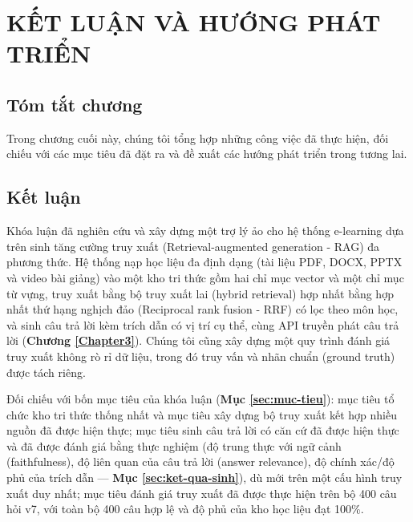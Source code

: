\chapter{KẾT LUẬN VÀ HƯỚNG PHÁT TRIỂN}
\label{Chapter5}

\section*{Tóm tắt chương}
Trong chương cuối này, chúng tôi tổng hợp những công việc đã thực hiện, đối chiếu với các mục tiêu đã đặt ra và đề xuất các hướng phát triển trong tương lai.

\section{Kết luận}

Khóa luận đã nghiên cứu và xây dựng một trợ lý ảo cho hệ thống e-learning dựa trên sinh tăng cường truy xuất (Retrieval-augmented generation - RAG) đa phương thức. Hệ thống nạp học liệu đa định dạng (tài liệu PDF, DOCX, PPTX và video bài giảng) vào một kho tri thức gồm hai chỉ mục vector và một chỉ mục từ vựng, truy xuất bằng bộ truy xuất lai (hybrid retrieval) hợp nhất bằng hợp nhất thứ hạng nghịch đảo (Reciprocal rank fusion - RRF) có lọc theo môn học, và sinh câu trả lời kèm trích dẫn có vị trí cụ thể, cùng API truyền phát câu trả lời (\textbf{Chương \ref{Chapter3}}). Chúng tôi cũng xây dựng một quy trình đánh giá truy xuất không rò rỉ dữ liệu, trong đó truy vấn và nhãn chuẩn (ground truth) được tách riêng.

\bigbreak\noindent
Đối chiếu với bốn mục tiêu của khóa luận (\textbf{Mục \ref{sec:muc-tieu}}): mục tiêu tổ chức kho tri thức thống nhất và mục tiêu xây dựng bộ truy xuất kết hợp nhiều nguồn đã được hiện thực; mục tiêu sinh câu trả lời có căn cứ đã được hiện thực và đã được đánh giá bằng thực nghiệm (độ trung thực với ngữ cảnh (faithfulness), độ liên quan của câu trả lời (answer relevance), độ chính xác/độ phủ của trích dẫn — \textbf{Mục \ref{sec:ket-qua-sinh}}), dù mới trên một cấu hình truy xuất duy nhất; mục tiêu đánh giá truy xuất đã được thực hiện trên bộ 400 câu hỏi v7, với toàn bộ 400 câu hợp lệ và độ phủ của kho học liệu đạt 100\%.

